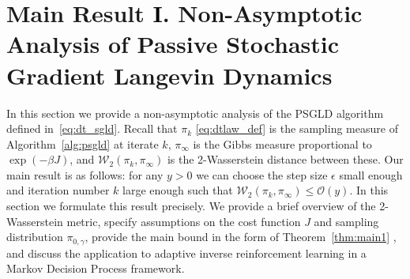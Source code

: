 \documentclass[journal,onecolumn]{IEEEtran}
\newcommand{\alk}{\alpha_k}
\newcommand{\alkk}{\alpha_{k+1}}
\newcommand{\thk}{\theta_k}
\newcommand{\step}{\epsilon}
\newcommand{\delstep}{\frac{1}{\Delta^N}}
\newcommand{\kernel}{K\left(\frac{\theta_k -\alk}{\Delta}\right)}
\newcommand{\grad}{\nabla}
\newcommand{\gradn}{\hat{\nabla}}
\newcommand{\rew}{J}
\newcommand{\reals}{\mathbb{R}}
\newcommand{\alt}{\alpha(t)}
\newcommand{\brownt}{W(t)}
\newcommand{\dimn}{N}
\newcommand{\wass}{\mathcal{W}_2}
\newcommand{\gibbs}{\ids_{\infty}}
\newcommand{\idistr}{\ids_0}
\newcommand{\dtlaw}{\ids_{k}} %
\newcommand{\N}{\mathbb{N}}
\newcommand{\ids}{\pi}
\newcommand{\idw}{\gamma}
\newcommand{\isp}{0,\idw}
\newcommand{\ksp}{k,\idw}
\newcommand{\idistrw}{\ids_{\isp}}
\newcommand{\hlb}{y} %
\begin{document}

\section{Main Result \textcolor{black}{I}. Non-Asymptotic Analysis of Passive Stochastic Gradient Langevin Dynamics}
\label{sec:main}
In this section we provide a non-asymptotic analysis of the PSGLD algorithm defined in~\eqref{eq:dt_sgld}. Recall that $\dtlaw$ \eqref{eq:dtlaw_def} is the sampling measure of Algorithm~\ref{alg:psgld} at iterate $k$, $\gibbs$ is the Gibbs measure proportional to $\exp(-\beta\rew)$, and $\wass(\dtlaw,\gibbs)$ is the 2-Wasserstein distance between these. Our main result is as follows: for any $\hlb>0$ we can choose the step size $\step$ small enough and iteration number $k$ large enough such that $\wass(\dtlaw,\gibbs) \leq \mathcal{O}(\hlb)$. In this section we formulate this result precisely. We provide a brief overview of the 2-Wasserstein metric, specify assumptions on the cost function $\rew$ and sampling distribution $\idistrw$, provide the main bound in the form of Theorem~\ref{thm:main1}
\label{sec:mainresults}, and discuss the application to adaptive inverse reinforcement learning in a Markov Decision Process framework. 
\end{document}
